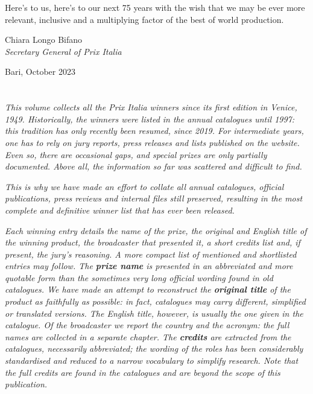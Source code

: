 {{Here's to us, here's to our next 75 years with the wish that we may be ever more relevant, inclusive and a multiplying factor of the best of world production.
\par\bigskip\par
\noindent Chiara Longo Bifano\\
\noindent\textit{Secretary General of Prix Italia}\\
\par
\noindent Bari, October 2023\\
\pagebreak\\
\vspace{70pt}\\
\textsl{This volume collects all the Prix Italia winners since its first edition in Venice, 1949. Historically, the winners were listed in the annual catalogues until 1997: this tradition has only recently been resumed, since 2019. For intermediate years, one has to rely on jury reports, press releases and lists published on the website. Even so, there are occasional gaps, and special prizes are only partially documented. Above all, the information so far was scattered and difficult to find.}

\textsl{This is why we have made an effort to collate all annual catalogues, official publications, press reviews and internal files still preserved, resulting in the most complete and definitive winner list that has ever been released.}

\bigskip

\textsl{Each winning entry details the name of the prize, the original and English title of the winning product, the broadcaster that presented it, a short credits list and, if present, the jury's reasoning. A more compact list of mentioned and shortlisted entries may follow. The \textbf{prize name} is presented in an abbreviated and more quotable form than the sometimes very long official wording found in old catalogues. We have made an attempt to reconstruct the \textbf{original title} of the product as faithfully as possible: in fact, catalogues may carry different, simplified or translated versions. The English title, however, is usually the one given in the catalogue. Of the broadcaster we report the country and the acronym: the full names are collected in a separate chapter. The \textbf{credits} are extracted from the catalogues, necessarily abbreviated; the wording of the roles has been considerably standardised and reduced to a narrow vocabulary to simplify research. Note that the full credits are found in the catalogues and are beyond the scope of this publication.}

}}
